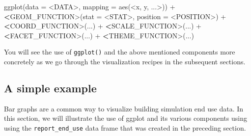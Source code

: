 \documentclass[
]{book}
\newenvironment{Shaded}{\begin{snugshade}}{\end{snugshade}}
\newcommand{\AttributeTok}[1]{\textcolor[rgb]{0.77,0.63,0.00}{#1}}
\newcommand{\ErrorTok}[1]{\textcolor[rgb]{0.64,0.00,0.00}{\textbf{#1}}}
\newcommand{\FunctionTok}[1]{\textcolor[rgb]{0.00,0.00,0.00}{#1}}
\newcommand{\NormalTok}[1]{#1}
\newcommand{\SpecialCharTok}[1]{\textcolor[rgb]{0.00,0.00,0.00}{#1}}
\begin{document}
\begin{Shaded}
\begin{Highlighting}[]
\FunctionTok{ggplot}\NormalTok{(}\AttributeTok{data =} \SpecialCharTok{\textless{}}\NormalTok{DATA}\SpecialCharTok{\textgreater{}}\NormalTok{, }\AttributeTok{mapping =} \FunctionTok{aes}\NormalTok{(}\SpecialCharTok{\textless{}}\NormalTok{x, y, ...}\SpecialCharTok{\textgreater{}}\NormalTok{)) }\SpecialCharTok{+}
    \ErrorTok{\textless{}}\NormalTok{GEOM\_FUNCTION}\SpecialCharTok{\textgreater{}}\NormalTok{(}\AttributeTok{stat =} \SpecialCharTok{\textless{}}\NormalTok{STAT}\SpecialCharTok{\textgreater{}}\NormalTok{, }\AttributeTok{position =} \SpecialCharTok{\textless{}}\NormalTok{POSITION}\SpecialCharTok{\textgreater{}}\NormalTok{) }\SpecialCharTok{+}
    \ErrorTok{\textless{}}\NormalTok{COORD\_FUNCTION}\SpecialCharTok{\textgreater{}}\NormalTok{(...) }\SpecialCharTok{+}
    \ErrorTok{\textless{}}\NormalTok{SCALE\_FUNCTION}\SpecialCharTok{\textgreater{}}\NormalTok{(...) }\SpecialCharTok{+}
    \ErrorTok{\textless{}}\NormalTok{FACET\_FUNCTION}\SpecialCharTok{\textgreater{}}\NormalTok{(...) }\SpecialCharTok{+}
    \ErrorTok{\textless{}}\NormalTok{THEME\_FUNCTION}\SpecialCharTok{\textgreater{}}\NormalTok{(...)}
\end{Highlighting}
\end{Shaded}

You will see the use of \texttt{ggplot()} and the above mentioned components more concretely as we go through the visualization recipes in the subsequent sections.

\hypertarget{a-simple-example}{%
\subsection{A simple example}\label{a-simple-example}}

Bar graphs are a common way to visualize building simulation end use data. In this section, we will illustrate the use of ggplot and its various components using using the \texttt{report\_end\_use} data frame that was created in the preceding section.
\end{document}
